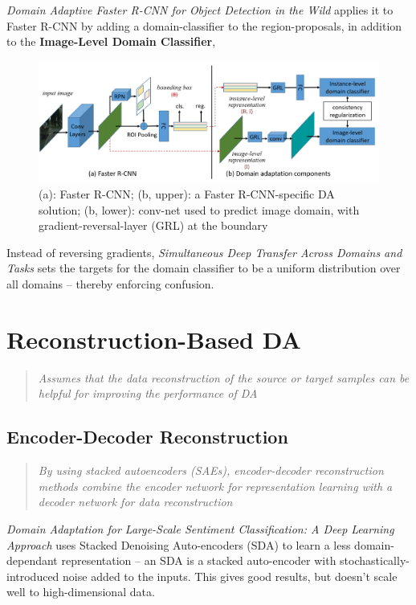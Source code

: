 \documentclass{report}
\newcommand{\quoteit}[1]{\begin{quote}\textit{#1}\end{quote}}
\begin{document}
\textit{Domain Adaptive Faster R-CNN for Object Detection in the Wild}\parencite{adaptrcnn} applies it to Faster R-CNN by adding a domain-classifier to the region-proposals, in addition to the \textbf{Image-Level Domain Classifier},
\begin{figure}[h!]
	\centering
	\includegraphics[width=14cm]{imgs/adaptrcnn}
	\caption{(a): Faster R-CNN; (b, upper): a Faster R-CNN-specific DA solution; (b, lower): conv-net used to predict image domain, with gradient-reversal-layer (GRL) at the boundary}
	\label{fig:adaptrcnn}
\end{figure}

Instead of reversing gradients, \textit{Simultaneous Deep Transfer Across Domains and Tasks}\parencite{simultaneousdeeptransfer} sets the targets for the domain classifier to be a uniform distribution over all domains -- thereby enforcing confusion.





\section{Reconstruction-Based DA}

\quoteit{Assumes that the data reconstruction of the source or target samples can be helpful for improving the performance of DA}

\subsection{Encoder-Decoder Reconstruction}
\quoteit{By using stacked autoencoders (SAEs), encoder-decoder reconstruction methods combine the encoder network for representation learning with a decoder network for data reconstruction}

\textit{Domain Adaptation for Large-Scale Sentiment Classification: A Deep Learning Approach}\parencite{domainadatpforlargescale} uses Stacked Denoising Auto-encoders (SDA) to learn a less domain-dependant representation -- an SDA is a stacked auto-encoder with stochastically-introduced noise added to the inputs. This gives good results, but doesn't scale well to high-dimensional data. \\
\end{document}
